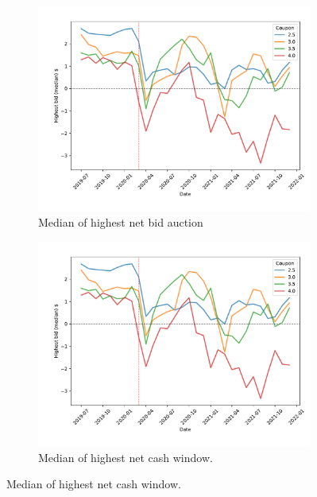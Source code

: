 \documentclass[11pt,a4paper]{article}
\begin{document}
\begin{figure}[]
\begin{subfigure}[b]{0.49\textwidth}
      \includegraphics[width=0.998\textwidth]{../results/figures/winner_bid_median_mat30_loan1_timeseries_cpmonthly_2.5_4_cash_window_netbid.pdf}
      \caption{ Median of highest net bid auction}
     \end{subfigure}
     \begin{subfigure}[b]{0.49\textwidth}
      \includegraphics[width=0.998\textwidth]{../results/figures/winner_bid_median_mat30_loan1_timeseries_cpmonthly_2.5_4_cash_window_netbid.pdf}
      \caption{ Median of highest net cash window.}
     \end{subfigure}

\end{figure}
\end{document}
